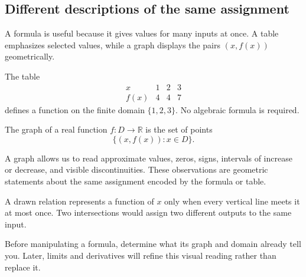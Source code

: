 \subsection{Different descriptions of the same assignment}

A formula is useful because it gives values for many inputs at once. A table emphasizes selected values, while a graph displays the pairs $(x,f(x))$ geometrically.

\begin{examplebox}
The table
\[
\begin{array}{c|ccc}
x&1&2&3\\ \hline
f(x)&4&4&7
\end{array}
\]
defines a function on the finite domain $\{1,2,3\}$. No algebraic formula is required.
\end{examplebox}

\begin{definitionbox}[Graph]
The graph of a real function $f:D\to\mathbb R$ is the set of points
\[
\{(x,f(x)):x\in D\}.
\]
\end{definitionbox}

A graph allows us to read approximate values, zeros, signs, intervals of increase or decrease, and visible discontinuities. These observations are geometric statements about the same assignment encoded by the formula or table.

\begin{interpretationbox}
A drawn relation represents a function of $x$ only when every vertical line meets it at most once. Two intersections would assign two different outputs to the same input.
\end{interpretationbox}

\begin{corebox}
Before manipulating a formula, determine what its graph and domain already tell you. Later, limits and derivatives will refine this visual reading rather than replace it.
\end{corebox}
